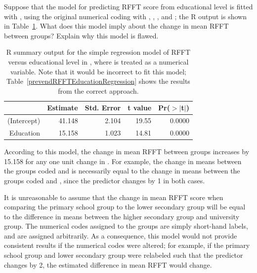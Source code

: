 \begin{example}{Suppose that the model for predicting RFFT score from educational level is fitted with , using the original numerical coding with , , , and ; the \textsf{R} output is shown in Table~\ref{prevendRFFTEducationNumRegression}. What does this model imply about the change in mean RFFT between groups? Explain why this model is flawed.
		
\begin{table}[ht]
	\centering
	\begin{tabular}{rrrrr}
		\hline
		& Estimate & Std. Error & t value & Pr($>$$|$t$|$) \\ 
		\hline
		(Intercept) & 41.148 & 2.104 & 19.55 & 0.0000 \\ 
		Education & 15.158 & 1.023 & 14.81 & 0.0000 \\ 
		\hline
	\end{tabular}
	\caption{\textsf{R} summary output for the simple regression model of RFFT versus educational level in , where  is treated as a numerical variable. Note that it would be incorrect to fit this model; Table~\ref{prevendRFFTEducationRegression} shows the results from the correct approach.} 
	\label{prevendRFFTEducationNumRegression}
\end{table}
		
}
	
According to this model, the change in mean RFFT between groups increases by 15.158 for any one unit change in . For example, the change in means between the groups coded  and  is necessarily equal to the change in means between the groups coded  and , since the predictor changes by 1 in both cases. 

It is unreasonable to assume that the change in mean RFFT score when comparing the primary school group to the lower secondary group will be equal to the difference in means between the higher secondary group and university group. The numerical codes assigned to the groups are simply short-hand labels, and are assigned arbitrarily. As a consequence, this model would not provide consistent results if the numerical codes were altered; for example, if the primary school group and lower secondary group were relabeled such that the predictor changes by 2, the estimated difference in mean RFFT would change. 

\end{example}

